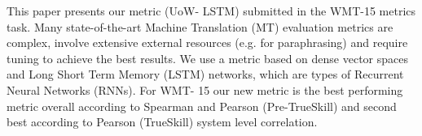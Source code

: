 This paper presents our metric (UoW- LSTM) submitted in the WMT-15 metrics task. Many state-of-the-art Machine Translation (MT) evaluation metrics are complex, involve extensive external resources (e.g. for paraphrasing) and require tuning to achieve the best results. We use a metric based on dense vector spaces and Long Short Term Memory (LSTM) networks, which are types of Recurrent Neural Networks (RNNs). For WMT- 15 our new metric is the best performing metric overall according to Spearman and Pearson (Pre-TrueSkill) and second best according to Pearson (TrueSkill) system level correlation.
